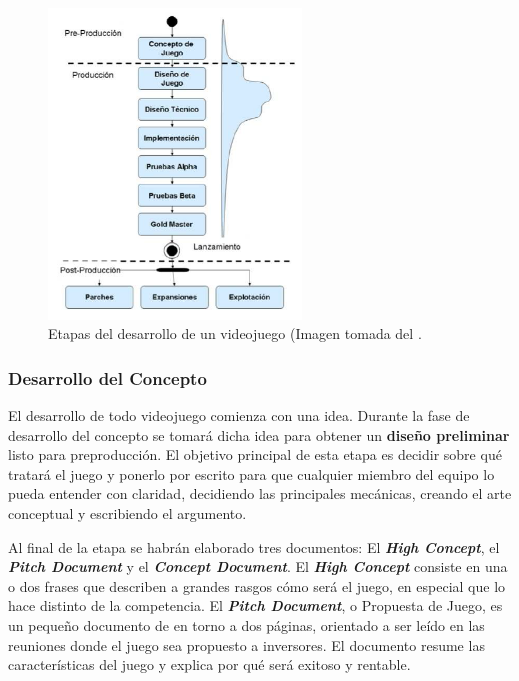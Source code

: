 \begin{figure}[h]
    \centering
    \includegraphics[width=0.6\textwidth]{images/estadodelarte/desarrollo/etapas-desarrollo}
    \caption{Etapas del desarrollo de un videojuego (Imagen tomada del \cite{libro_esi}.}
    \label{etapas-desarrollo}
\end{figure}

\subsubsection{Desarrollo del Concepto}
El desarrollo de todo videojuego comienza con una idea. Durante la fase de desarrollo del concepto se tomará dicha idea para obtener un \textbf{diseño preliminar} listo para preproducción. El objetivo principal de esta etapa es decidir sobre qué tratará el juego y ponerlo por escrito para que cualquier miembro del equipo lo pueda entender con claridad, decidiendo las principales mecánicas, creando el arte conceptual y escribiendo el argumento\cite{game_design_2}. 

Al final de la etapa se habrán elaborado tres documentos: El \textbf{\textit{High Concept}}, el \textbf{\textit{Pitch Document}} y el \textbf{\textit{Concept Document}}. El \textbf{\textit{High Concept}} consiste en una o dos frases que describen a grandes rasgos cómo será el juego, en especial que lo hace distinto de la competencia. El \textbf{\textit{Pitch Document}}, o Propuesta de Juego, es un pequeño documento de en torno a dos páginas, orientado a ser leído en las reuniones donde el juego sea propuesto a inversores. El documento resume las características del juego y explica por qué será exitoso y rentable.

